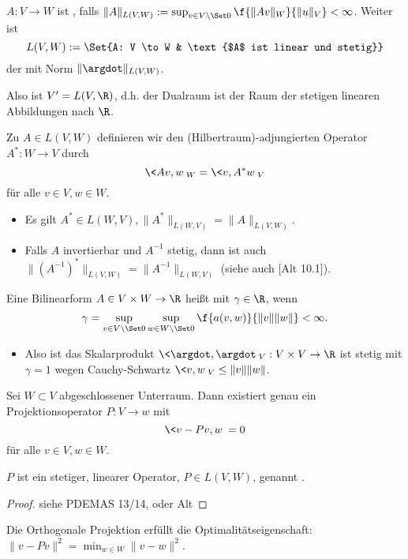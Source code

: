 \begin{df} \label{3.14}
	$A: V \to W$ ist , falls $\|A\|_{L(V,W)} := \sup_{v \in V\setminus \Set 0} \f{\|Av\|_W}{\|u\|_V} < \infty$.
	Weiter ist
	\[
		L(V,W) := \Set{A: V \to W & \text{$A$ ist linear und stetig}}
	\]
	der  mit Norm $\|\argdot\|_{L(V,W)}$.
	\begin{note}
		Also ist $V' = L(V, \R)$, d.h. der Dualraum ist der Raum der stetigen linearen Abbildungen nach $\R$.
	\end{note}
\end{df}

\begin{df} \label{3.15}
	Zu $A \in L(V,W)$ definieren wir den (Hilbertraum)-adjungierten Operator $A^*: W \to V$ durch
	\[
		\<Av,w\>_W = \<v,A^*w\>_V
	\]
	für alle $v \in V, w \in W$.
	\begin{note}
		\begin{itemize}
			\item
				Es gilt $A^* \in L(W,V), \|A^*\|_{L(W,V)} = \|A\|_{L(V,W)}$.
			\item
				Falls $A$ invertierbar und $A^{-1}$ stetig, dann ist auch $\|(A^{-1})^*\|_{L(V,W)} = \|A^{-1}\|_{L(W,V)}$ (siehe auch [Alt 10.1]).
		\end{itemize}
	\end{note}
\end{df}

\begin{df} \label{3.16}
	Eine Bilinearform $A \in V \times W \to \R$ heißt  mit  $\gamma \in \R$, wenn
	\[
		\gamma = \sup_{v \in V\setminus \Set 0} \sup_{w \in W \setminus \Set 0} \f{a(v,w)}{\|v\|\|w\|} < \infty.
	\]
	\begin{note}
		\begin{itemize}
			\item
				Also ist das Skalarprodukt $\<\argdot, \argdot\>_V: V \times V \to \R$ ist stetig mit $\gamma = 1$ wegen Cauchy-Schwartz $\<v, w\>_V \le \|v\|\|w\|$.
		\end{itemize}
	\end{note}
\end{df}

\begin{st}[Projektionssatz] \label{3.17}
	Sei $W \subset V$ abgeschlossener Unterraum.
	Dann existiert genau ein Projektionsoperator $P: V \to w$ mit
	\[
		\<v - Pv, w\> = 0
	\]
	für alle $v \in V, w \in W$.

	$P$ ist ein stetiger, linearer Operator, $P \in L(V,W)$, genannt .
	\begin{proof}
		siehe PDEMAS 13/14, oder Alt
	\end{proof}
	\begin{note}
		Die Orthogonale Projektion erfüllt die Optimalitätseigenschaft: $\|v - Pv\|^2 = \min_{w\in W} \|v - w\|^2$.
	\end{note}
\end{st}

